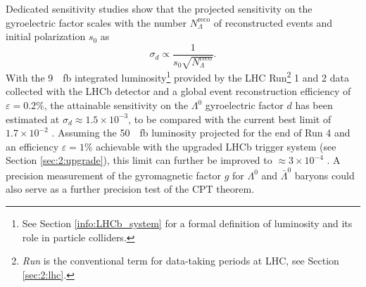 Dedicated sensitivity studies \cite{EMDipoleSearch} show that the projected sensitivity on the \lz gyroelectric factor scales with the number $N_\Lambda^\text{reco}$ of reconstructed \demonstratorshort events and initial polarization $s_0$ as
\begin{equation}
\sigma_d \propto \frac{1}{s_0 \sqrt{N_\Lambda^\text{reco}}}.
\end{equation}
With the \SI{9}{\per\femto\barn} integrated luminosity\footnote{See Section \ref{info:LHCb_system} for a formal definition of luminosity and its role in particle colliders.} provided by the LHC Run\footnote{\textit{Run} is the conventional term for data-taking periods at LHC, see Section \ref{sec:2:lhc}.} 1 and 2 data collected with the LHCb detector and a global event reconstruction efficiency of $\varepsilon = 0.2\%$, the attainable sensitivity on the $\Lambda^0$ gyroelectric factor $d$ has been estimated at $\sigma_d \approx 1.5\times {10}^{-3}$, to be compared with the current best limit of $1.7 \times {10}^{-2}$ \cite{PhysRevD.23.814}.
Assuming the \SI{50}{\per\femto\barn} luminosity projected for the end of Run 4 and an efficiency $\varepsilon = 1\%$ achievable with the upgraded LHCb trigger system (see Section \ref{sec:2:upgrade}), this limit can further be improved to $\approx 3\times {10}^{-4}$ \cite{EMDipoleSearch}.
A precision measurement of the gyromagnetic factor $g$ for $\Lambda^0$ and $\bar{\Lambda}^0$ baryons could also serve as a further precision test of the CPT theorem.


